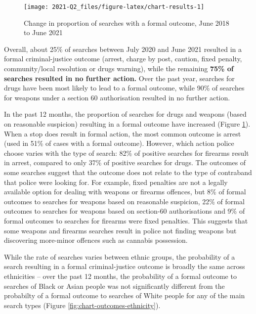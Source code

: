 \documentclass[
  a4paper,
  twoside, 11pt]{article}
\begin{document}
\begin{figure}[tb]

{\centering \texttt{[image: 2021-Q2\_files/figure-latex/chart-results-1]} 

}

\caption{Change in proportion of searches with a formal outcome, June 2018 to June 2021}\label{fig:chart-results}
\end{figure}

Overall, about 25\% of searches between July 2020 and June 2021 resulted in a formal criminal-justice outcome (arrest, charge by post, caution, fixed penalty, community/local resolution or drugs warning), while the remaining \textbf{75\% of searches resulted in no further action.} Over the past year, searches for drugs have been most likely to lead to a formal outcome, while 90\% of searches for weapons under a section 60 authorisation resulted in no further action.

In the past 12 months, the proportion of searches for drugs and weapons (based on reasonable suspicion) resulting in a formal outcome have increased (Figure \ref{fig:chart-results}). When a stop does result in formal action, the most common outcome is arrest (used in 51\% of cases with a formal outcome). However, which action police choose varies with the type of search: 82\% of positive searches for firearms result in arrest, compared to only 37\% of positive searches for drugs. The outcomes of some searches suggest that the outcome does not relate to the type of contraband that police were looking for. For example, fixed penalties are not a legally available option for dealing with weapons or firearms offences, but 8\% of formal outcomes to searches for weapons based on reasonable suspicion, 22\% of formal outcomes to searches for weapons based on section-60 authorisations and 9\% of formal outcomes to searches for firearms were fixed penalties. This suggests that some weapons and firearms searches result in police not finding weapons but discovering more-minor offences such as cannabis possession.

While the rate of searches varies between ethnic groups, the probability of a search resulting in a formal criminal-justice outcome is broadly the same across ethnicities -- over the past 12 months, the probability of a formal outcome to searches of Black or Asian people was not significantly different from the probabilty of a formal outcome to searches of White people for any of the main search types (Figure \ref{fig:chart-outcomes-ethnicity}).
\end{document}
